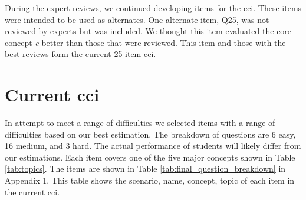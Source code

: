 \iflong

During the expert reviews, we continued developing items for the \gls{cci}. These items were intended to be used as alternates. One alternate item, Q25, was not reviewed by experts but was included. We thought this item evaluated the core concept \textit{\gls{c}} better than those that were reviewed. This item and those with the best reviews form the current 25 item \gls{cci}.

\fi


\section{Current \gls{cci}}

In attempt to meet a range of difficulties we selected items with a range of difficulties based on our best estimation. The breakdown of questions are 6 easy, 16 medium, and 3 hard. The actual performance of students will likely differ from our estimations. Each item covers one of the five major concepts shown in Table \ref{tab:topics}. \iflong The items are shown in Table \ref{tab:final_question_breakdown} in Appendix 1. This table shows the scenario, name, concept, topic of each item in the current \gls{cci}.\fi 





\iflong
\begin{table}[!h]
\centering
\caption{Five Core Concepts of Cybersecurity}
\label{tab:topics}
\end{table}
\fi
\ifshort
\begin{table}[!h]
\centering
\caption{Five Core Concepts of Cybersecurity}
\label{tab:topics}
\end{table}
\fi




